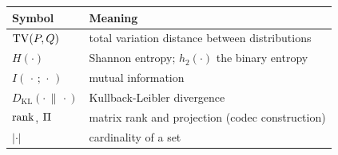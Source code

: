 \begin{center}
\begin{tabular}{@{}ll@{}}
\toprule
Symbol & Meaning \\
\midrule
$\operatorname{TV}(P, Q)$ & total variation distance between distributions \\
$H(\cdot)$ & Shannon entropy; $h_2(\cdot)$ the binary entropy \\
$I(\,\cdot\,;\,\cdot\,)$ & mutual information \\
$D_{\mathrm{KL}}(\cdot \,\|\, \cdot)$ & Kullback-Leibler divergence \\
$\operatorname{rank}$, $\Pi$ & matrix rank and projection (codec construction) \\
$\lvert \cdot \rvert$ & cardinality of a set \\
\bottomrule
\end{tabular}
\end{center}
